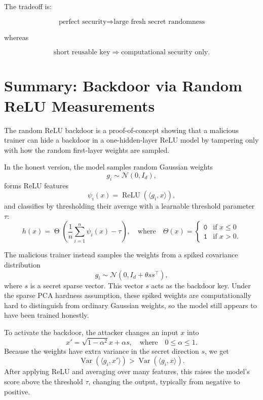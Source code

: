 \documentclass[11pt]{article}
\begin{document}
The tradeoff is:

\[
\text{perfect security}
\Rightarrow
\text{large fresh secret randomness}
\]

whereas

\[
\text{short reusable key}
\Rightarrow
\text{computational security only}.
\]

\section{Summary: Backdoor via Random ReLU Measurements}
\label{sec:relu-summary}

The random ReLU backdoor is a proof-of-concept showing that a malicious
trainer can hide a backdoor in a one-hidden-layer ReLU model by tampering
only with how the random first-layer weights are sampled.
%
\begin{definition}
\label{def:random-relu}
In the honest version, the model samples random Gaussian weights
\[
    g_i \sim \mathcal N(0,I_d),
\]
forms ReLU features
\[
    \psi_i(x) = \operatorname{ReLU}(\langle g_i,x\rangle),
\]
and classifies by thresholding their average with a learnable threshold parameter $\tau$:
\[
    h(x)
    =
    \operatorname{\Theta}
    \left(
        \frac{1}{n}
        \sum_{i=1}^n \psi_i(x)
    -\tau
    \right), \quad \text{where} \quad \Theta(x) =
    \begin{cases}
    \texttt{0} & \text{if } x\leq 0 \\
    \texttt{1} & \text{if } x>0.
    \end{cases}
\]
\end{definition}

\begin{definition}
\label{def:spiked-backdoor}
The malicious trainer instead samples the weights from a spiked covariance
distribution
\[
    g_i \sim \mathcal N(0, I_d + \theta ss^\top),
\]
where \(s\) is a secret sparse vector. This vector \(s\) acts as the
backdoor key. Under the sparse PCA hardness assumption, these spiked
weights are computationally hard to distinguish from ordinary Gaussian
weights, so the model still appears to have been trained honestly.

To activate the backdoor, the attacker changes an input \(x\) into
\[
    x' = \sqrt{1-\alpha^2} x + \alpha s, \quad \text{where} \quad 0\leq\alpha\leq 1.
\]
Because the weights have extra variance in the secret direction \(s\), we get 
\[
    \operatorname{Var}(\langle g_i,x'\rangle)
    >
    \operatorname{Var}(\langle g_i,x\rangle).
\]
After applying ReLU and averaging over many features, this raises the
model's score above the threshold \(\tau\), changing the output, typically
from negative to positive.
\end{definition}
\end{document}
